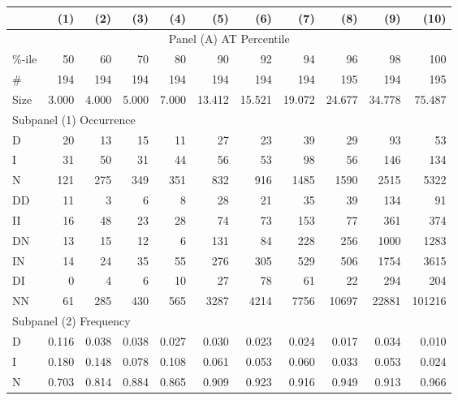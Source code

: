 \clearpage
{\footnotesize \begin{tabular}{lrrrrrrrrrr}
\hline\hline
&   (1) &   (2) &   (3) &   (4) &    (5) &    (6) &    (7) &    (8) &    (9) &   (10) \\ \hline\hline
\multicolumn{11}{c}{Panel (A) AT Percentile}                         \\ \hline\hline
\%-ile &    50 &    60 &    70 &    80 &     90 &     92 &     94 &     96 &     98 &    100 \\
\#     &   194 &   194 &   194 &   194 &    194 &    194 &    194 &    195 &    194 &    195 \\
Size   & 3.000 & 4.000 & 5.000 & 7.000 & 13.412 & 15.521 & 19.072 & 24.677 & 34.778 & 75.487 \\ \hline
\multicolumn{11}{l}{Subpanel (1) Occurrence}                                                 \\ \hline
D      &    20 &    13 &    15 &    11 &     27 &     23 &     39 &     29 &     93 &     53 \\
I      &    31 &    50 &    31 &    44 &     56 &     53 &     98 &     56 &    146 &    134 \\
N      &   121 &   275 &   349 &   351 &    832 &    916 &   1485 &   1590 &   2515 &   5322 \\
DD     &    11 &     3 &     6 &     8 &     28 &     21 &     35 &     39 &    134 &     91 \\
II     &    16 &    48 &    23 &    28 &     74 &     73 &    153 &     77 &    361 &    374 \\
DN     &    13 &    15 &    12 &     6 &    131 &     84 &    228 &    256 &   1000 &   1283 \\
IN     &    14 &    24 &    35 &    55 &    276 &    305 &    529 &    506 &   1754 &   3615 \\
DI     &     0 &     4 &     6 &    10 &     27 &     78 &     61 &     22 &    294 &    204 \\
NN     &    61 &   285 &   430 &   565 &   3287 &   4214 &   7756 &  10697 &  22881 & 101216 \\ \hline
\multicolumn{11}{l}{Subpanel (2) Frequency}                                                  \\ \hline
D      & 0.116 & 0.038 & 0.038 & 0.027 &  0.030 &  0.023 &  0.024 &  0.017 &  0.034 &  0.010 \\
I      & 0.180 & 0.148 & 0.078 & 0.108 &  0.061 &  0.053 &  0.060 &  0.033 &  0.053 &  0.024 \\
N      & 0.703 & 0.814 & 0.884 & 0.865 &  0.909 &  0.923 &  0.916 &  0.949 &  0.913 &  0.966 \\

\end{tabular}}
